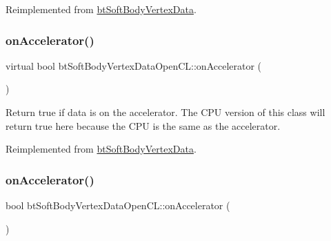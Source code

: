 Reimplemented from \hyperlink{classbtSoftBodyVertexData_a2d3f04a5b2461bf95beca6f3fc48e28b}{bt\+Soft\+Body\+Vertex\+Data}.

\mbox{\label{classbtSoftBodyVertexDataOpenCL_addc1f56a6841561023f4bd48ab2f6dd9}} 
\subsubsection{\texorpdfstring{on\+Accelerator()}{onAccelerator()}\hspace{0.1cm}{\footnotesize\ttfamily [1/2]}}
{\footnotesize\ttfamily virtual bool bt\+Soft\+Body\+Vertex\+Data\+Open\+C\+L\+::on\+Accelerator (\begin{DoxyParamCaption}{ }\end{DoxyParamCaption})\hspace{0.3cm}{\ttfamily [virtual]}}

Return true if data is on the accelerator. The C\+PU version of this class will return true here because the C\+PU is the same as the accelerator. 

Reimplemented from \hyperlink{classbtSoftBodyVertexData_a6512d196039f6445489a093ad18f7764}{bt\+Soft\+Body\+Vertex\+Data}.

\mbox{\label{classbtSoftBodyVertexDataOpenCL_a0277617dbd360ea14ec7848f85b69f4c}} 
\subsubsection{\texorpdfstring{on\+Accelerator()}{onAccelerator()}\hspace{0.1cm}{\footnotesize\ttfamily [2/2]}}
{\footnotesize\ttfamily bool bt\+Soft\+Body\+Vertex\+Data\+Open\+C\+L\+::on\+Accelerator (\begin{DoxyParamCaption}{ }\end{DoxyParamCaption})\hspace{0.3cm}{\ttfamily [virtual]}}

